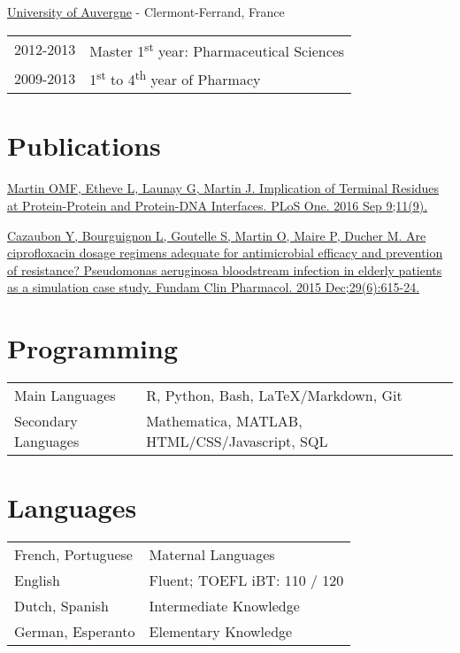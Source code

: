 \documentclass[a4paper, 10pt]{article} %
\begin{document}
\href{http://www.u-clermont1.fr/}{University of Auvergne} - Clermont-Ferrand, France

\begin{tabular}{ll}
\textsc{2012-2013} & Master 1\textsuperscript{st} year: Pharmaceutical Sciences \\
\textsc{2009-2013} & 1\textsuperscript{st} to 4\textsuperscript{th} year of Pharmacy
\end{tabular}


\section{Publications}

\href{http://www.ncbi.nlm.nih.gov/pubmed/27611671}{Martin OMF, Etheve L, Launay G, Martin J. Implication of Terminal Residues at Protein-Protein and Protein-DNA Interfaces. PLoS One. 2016 Sep 9;11(9).}

\href{http://www.ncbi.nlm.nih.gov/pubmed/26406268}{Cazaubon Y, Bourguignon L, Goutelle S, Martin O, Maire P, Ducher M. Are ciprofloxacin dosage regimens adequate for antimicrobial efficacy and prevention of resistance? Pseudomonas aeruginosa bloodstream infection in elderly patients as a simulation case study. Fundam Clin Pharmacol. 2015 Dec;29(6):615-24.}


\section{Programming}
\begin{tabular}{ll}
Main Languages & R, Python, Bash, \LaTeX/Markdown, Git \\
Secondary Languages & Mathematica, MATLAB, HTML/CSS/Javascript, SQL \\
\end{tabular}


\section{Languages}
\begin{tabular}{ll}
French, Portuguese & Maternal Languages\\
English & Fluent; TOEFL iBT: 110 / 120\\
Dutch, Spanish & Intermediate Knowledge \\
German, Esperanto & Elementary Knowledge \\
\end{tabular}
\end{document}

